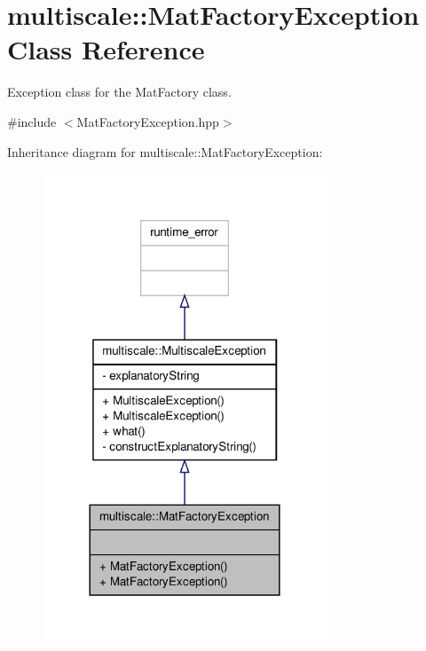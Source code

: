 \hypertarget{classmultiscale_1_1MatFactoryException}{\section{multiscale\-:\-:Mat\-Factory\-Exception Class Reference}
\label{classmultiscale_1_1MatFactoryException}
}


Exception class for the Mat\-Factory class.  




{\ttfamily \#include $<$Mat\-Factory\-Exception.\-hpp$>$}



Inheritance diagram for multiscale\-:\-:Mat\-Factory\-Exception\-:\nopagebreak
\begin{figure}[H]
\begin{center}
\leavevmode
\includegraphics[width=240pt]{classmultiscale_1_1MatFactoryException__inherit__graph}
\end{center}
\end{figure}


